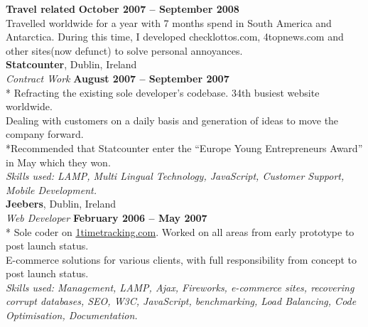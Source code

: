 \documentclass[margin,line]{resume}
\begin{document}
\begin{resume}
    \textbf{Travel related} \hfill \textbf{October 2007 -- September 2008}\vspace{1mm}\\%
    Travelled worldwide for a year with 7 months spend in South America and Antarctica. During this time, I developed checklottos.com, 4topnews.com and other sites(now defunct) to solve personal annoyances. \vspace{1mm}\\%

    \textbf{Statcounter}, Dublin, Ireland \vspace{2mm}\\\vspace{1mm}%
    \textsl{Contract Work} \hfill \textbf{August 2007 -- September 2007}\\*
    Refracting the existing sole developer's codebase. 34th busiest website worldwide. \vspace{1mm}\\%
    Dealing with customers on a daily basis and generation of ideas to move the company forward. \\*Recommended that Statcounter enter the ``Europe Young Entrepreneurs Award'' in May which they won.\vspace{1mm}\\%
    \textsl{Skills used: LAMP, Multi Lingual Technology, JavaScript, Customer Support, Mobile Development.}\vspace{1mm}\\


    \textbf{Jeebers}, Dublin, Ireland \vspace{2mm}\\\vspace{1mm}%
    \textsl{Web Developer} \hfill \textbf{February 2006 -- May 2007}\\*
    Sole coder on \href{http://1timetracking.com}{1timetracking.com}. Worked on all areas from early prototype to post launch status. \\%
    E-commerce solutions for various clients, with full responsibility from concept to post launch status. \vspace{1mm}\\%
    \textsl{Skills used: Management, LAMP, Ajax, Fireworks, e-commerce sites, recovering corrupt databases, SEO, W3C, JavaScript, benchmarking, Load Balancing, Code Optimisation, Documentation.}\vspace{1mm}\\%



\end{resume}
\end{document}
